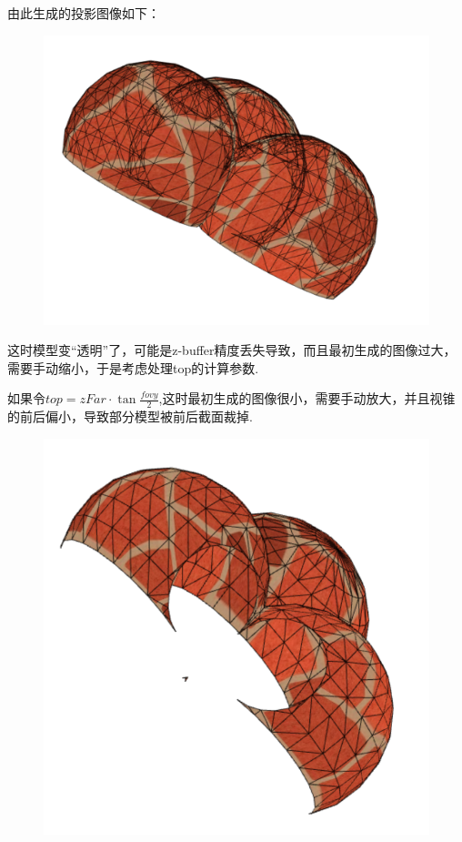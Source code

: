 \documentclass[12pt]{article}
\begin{document}
由此生成的投影图像如下：
\begin{figure}[htbp]
    \centering
    \includegraphics[scale=0.5]{pic03.png}
\end{figure}
这时模型变“透明”了，可能是z-buffer精度丢失导致，而且最初生成的图像过大，需要手动缩小，于是考虑处理top的计算参数.

如果令$top=zFar\cdot  \tan\frac{fovy}{2}$,这时最初生成的图像很小，需要手动放大，并且视锥的前后偏小，导致部分模型被前后截面裁掉.
\begin{figure}[htbp]
    \centering
    \includegraphics[scale=0.5]{pic04.png}
\end{figure}
\end{document}

